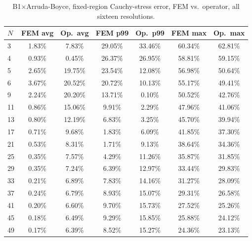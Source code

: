 \documentclass[final,5p,times]{elsarticle}
\begin{document}
\begin{table}[ht]
\centering
\caption{B1$\times$Arruda-Boyce, fixed-region Cauchy-stress error, FEM
  vs.\ operator, all sixteen resolutions.}
\label{tab:b1-b1ab-b}
\scriptsize
\begin{tabular}{lcccccc}
\toprule
$N$ & FEM avg & Op.\ avg & FEM p99 & Op.\ p99 & FEM max & Op.\ max \\
\midrule
3  & 1.83\% & 7.83\%  & 29.05\% & 33.46\% & 60.34\% & 62.81\% \\
4  & 0.93\% & 0.45\%  & 26.37\% & 26.95\% & 58.81\% & 59.15\% \\
5  & 2.65\% & 19.75\% & 23.54\% & 12.08\% & 56.98\% & 50.64\% \\
6  & 3.67\% & 20.52\% & 20.72\% & 10.13\% & 55.17\% & 49.41\% \\
9  & 2.24\% & 20.20\% & 13.71\% & 0.10\%  & 50.52\% & 42.76\% \\
11 & 0.86\% & 15.06\% & 9.91\%  & 2.29\%  & 47.96\% & 41.06\% \\
13 & 0.80\% & 12.19\% & 6.83\%  & 3.25\%  & 45.70\% & 39.94\% \\
17 & 0.71\% & 9.68\%  & 1.83\%  & 6.09\%  & 41.85\% & 37.30\% \\
21 & 0.53\% & 8.31\%  & 1.71\%  & 9.13\%  & 38.64\% & 34.36\% \\
25 & 0.35\% & 7.57\%  & 4.29\%  & 11.26\% & 35.87\% & 31.85\% \\
29 & 0.35\% & 7.24\%  & 6.39\%  & 12.97\% & 33.44\% & 29.83\% \\
33 & 0.21\% & 6.89\%  & 7.83\%  & 14.16\% & 31.27\% & 28.09\% \\
37 & 0.24\% & 6.79\%  & 8.93\%  & 15.07\% & 29.31\% & 26.58\% \\
41 & 0.20\% & 6.60\%  & 9.70\%  & 15.73\% & 27.52\% & 25.26\% \\
45 & 0.18\% & 6.49\%  & 9.29\%  & 15.85\% & 25.88\% & 24.12\% \\
49 & 0.17\% & 6.39\%  & 8.52\%  & 15.27\% & 24.36\% & 23.13\% \\
\bottomrule
\end{tabular}
\end{table}
\end{document}
